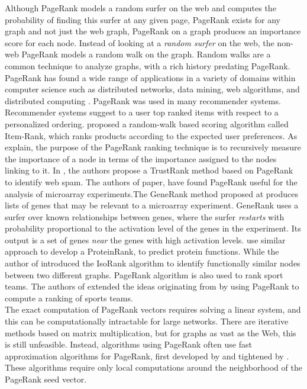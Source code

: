 \documentclass[11pt,oneside]{book}
\begin{document}
Although PageRank models a random surfer on the web and computes the probability of finding this surfer at any given page, PageRank exists for any graph and not just the web graph, PageRank on a graph produces an importance score for each node. Instead of looking at a \textit{random surfer} on the web, the non-web PageRank models a random walk on the graph. Random walks are a common technique to analyze graphs, with a rich history predating PageRank.
PageRank has found a wide range of applications in a variety of domains within computer science such as distributed networks, data mining, web algorithms, and distributed computing \citep{cook04,Bianchini05,LangvilleM03}.
PageRank was used in many recommender systems. Recommender systems suggest to a user top ranked items with respect to a personalized ordering. \citep{gori2006random} proposed a random-walk based scoring algorithm called Item-Rank, which ranks products according to the expected user preferences.
As \citep{franceschet2011pagerank} explain, the purpose of the PageRank ranking technique is to recursively measure the importance of a node in terms of the importance assigned to the nodes linking to it. In \citep{gyongyi2004combating}, the authors propose a TrustRank method based on PageRank to identify web spam. The authors of \citep{morrison2005generank} paper, have found PageRank useful for the analysis of microarray experiments.The GeneRank method proposed at \citep{morrison2005generank} produces lists of genes that may be relevant to a microarray experiment. GeneRank uses a surfer over known relationships between genes, where the surfer \textit{restarts} with probability proportional to the activation level of the genes in the experiment. Its output is a set of genes \textit{near} the genes with high activation levels. \citep{freschi2007protein} use similar approach to develop a ProteinRank, to predict protein functions. While the author of \citep{singh2007pairwise} introduced the IsoRank algorithm to identify functionally similar nodes between two different graphs. PageRank algorithm is also used to rank sport teams. The authors of \citep{govan2009offense} extended the ideas originating from \citep{keener1993perron} by using PageRank to compute a ranking of sports teams.\\
The exact computation of PageRank vectors requires solving a linear system, and this can be computationally intractable for large networks. There are iterative methods based on matrix multiplication, but for graphs as vast as the Web, this is still unfeasible. Instead, algorithms using PageRank often use fast approximation algorithms for PageRank, first developed by \citep{andersen2006local} and tightened by \citep{chung2010sharp}. These algorithms require only
local computations around the neighborhood of the PageRank seed vector.
\end{document}
